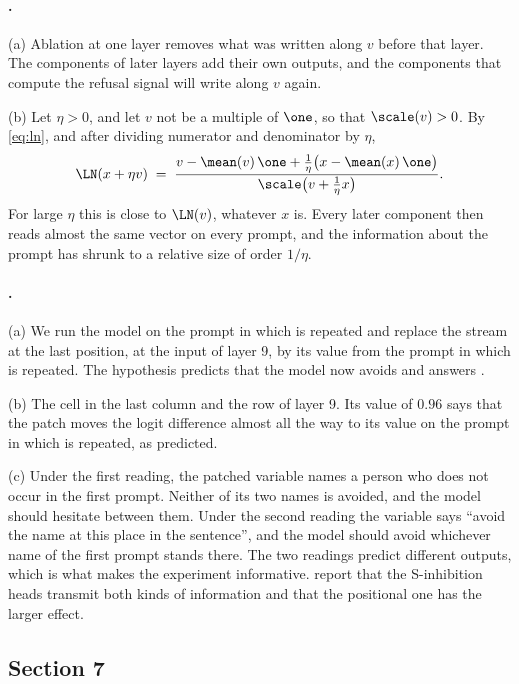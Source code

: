 {\paragraph{.}
(a) Ablation at one layer removes what was written along $v$ before that layer. The components of later layers
add their own outputs, and the components that compute the refusal signal will write along $v$ again.

(b) Let $\eta>0$, and let $v$ not be a multiple of $\one$, so that $\scale(v)>0$. By \eqref{eq:ln}, and after
dividing numerator and denominator by $\eta$,
\[
\LN(x+\eta v) \;=\; \frac{v-\mean(v)\,\one+\tfrac1\eta\big(x-\mean(x)\,\one\big)}{\scale\big(v+\tfrac1\eta x\big)} .
\]
For large $\eta$ this is close to $\LN(v)$, whatever $x$ is. Every later component then reads almost the same
vector on every prompt, and the information about the prompt has shrunk to a relative size of order $1/\eta$.

\paragraph{.}
(a) We run the model on the prompt in which  is repeated and replace the stream at the last position,
at the input of layer 9, by its value from the prompt in which  is repeated. The hypothesis predicts
that the model now avoids  and answers .

(b) The cell in the last column and the row of layer 9. Its value of $0.96$ says that the patch moves the logit
difference almost all the way to its value on the prompt in which  is repeated, as predicted.

(c) Under the first reading, the patched variable names a person who does not occur in the first prompt. Neither
of its two names is avoided, and the model should hesitate between them. Under the second reading the variable
says ``avoid the name at this place in the sentence'', and the model should avoid whichever name of the first
prompt stands there. The two readings predict different outputs, which is what makes the experiment informative.
\citet{wang2023interpretability} report that the S-inhibition heads transmit both kinds of information and that
the positional one has the larger effect.

\subsection*{Section 7}

}
